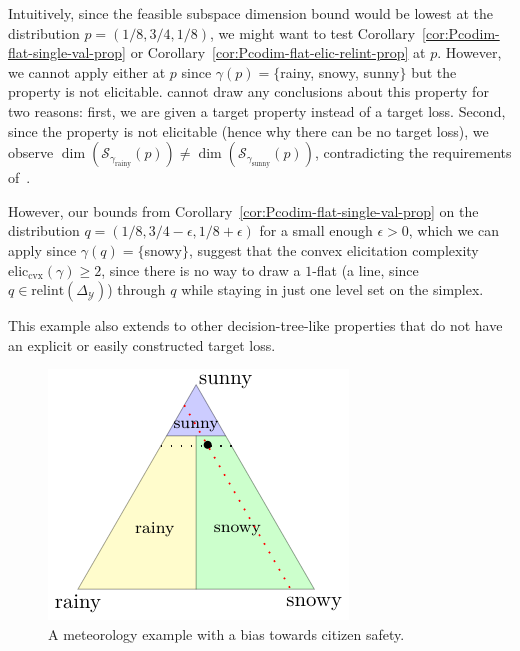 \documentclass[anon,12pt]{colt2021} %
\newcommand{\simplex}{\Delta_\Y}
\newcommand{\relint}[1]{\mathrm{relint}(#1)}
\newcommand{\eliccvx}{\mathrm{elic}_\mathrm{cvx}}
\newcommand{\Sc}{\mathcal{S}}  %
\newcommand{\Y}{\mathcal{Y}}
\begin{document}
Intuitively, since the feasible subspace dimension bound would be lowest at the distribution $p = (1/8, 3/4,1/8)$, we might want to test Corollary~\ref{cor:Pcodim-flat-single-val-prop} or Corollary~\ref{cor:Pcodim-flat-elic-relint-prop} at $p$.
However, we cannot apply either at $p$ since $\gamma(p) = \{$rainy, snowy, sunny$\}$ but the property is not elicitable.
\citet[Theorem 16]{ramaswamy2016convex} cannot draw any conclusions about this property for two reasons: first, we are given a target property instead of a target loss.
Second, since the property is not elicitable (hence why there can be no target loss), we observe $\dim(\Sc_{\gamma_{\text{rainy}}}(p)) \neq \dim(\Sc_{\gamma_{\text{sunny}}}(p))$, contradicting the requirements of~\citet[Lemma 23]{ramaswamy2016convex}.

However, our bounds from Corollary~\ref{cor:Pcodim-flat-single-val-prop} on the distribution $q = (1/8, 3/4 - \epsilon, 1/8 + \epsilon)$ for a small enough $\epsilon > 0$, which we can apply since $\gamma(q) = \{$snowy$\}$, suggest that the convex elicitation complexity $\eliccvx(\gamma) \geq 2$, since there is no way to draw a $1$-flat (a line, since $q \in \relint{\simplex}$) through $q$ while staying in just one level set on the simplex.


This example also extends to other decision-tree-like properties that do not have an explicit or easily constructed target loss.
\begin{figure}
	\centering
	\includegraphics[width=0.3\linewidth]{tikz/t-example.pdf}
	\caption{A meteorology example with a bias towards citizen safety.}
	\label{fig:t-example}
\end{figure}
\end{document}
